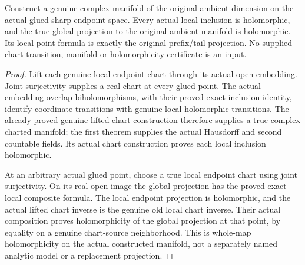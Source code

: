 \begin{theorem}
\label{hir:sharp-actual-original-global-complex-endpoint}
\leanok
{}
Construct a genuine complex manifold of the original ambient dimension on
the actual glued sharp endpoint space. Every actual local inclusion is
holomorphic, and the true global projection to the original ambient manifold
is holomorphic. Its local point formula is exactly the original prefix/tail
projection. No supplied chart-transition, manifold or holomorphicity
certificate is an input.
\end{theorem}
\begin{proof}
Lift each genuine local endpoint chart through its actual open embedding.
Joint surjectivity supplies a real chart at every glued point. The actual
embedding-overlap biholomorphisms, with their proved exact inclusion identity,
identify coordinate transitions with genuine local holomorphic transitions.
The already proved genuine lifted-chart construction therefore supplies a
true complex charted manifold; the first theorem supplies the actual
Hausdorff and second countable fields. Its actual chart construction proves
each local inclusion holomorphic.

At an arbitrary actual glued point, choose a true local endpoint chart using
joint surjectivity. On its real open image the global projection has the
proved exact local composite formula. The local endpoint projection is
holomorphic, and the actual lifted chart inverse is the genuine old local
chart inverse. Their actual composition proves holomorphicity of the global
projection at that point, by equality on a genuine chart-source neighborhood.
This is whole-map holomorphicity on the actual constructed manifold, not a
separately named analytic model or a replacement projection.
\end{proof}

